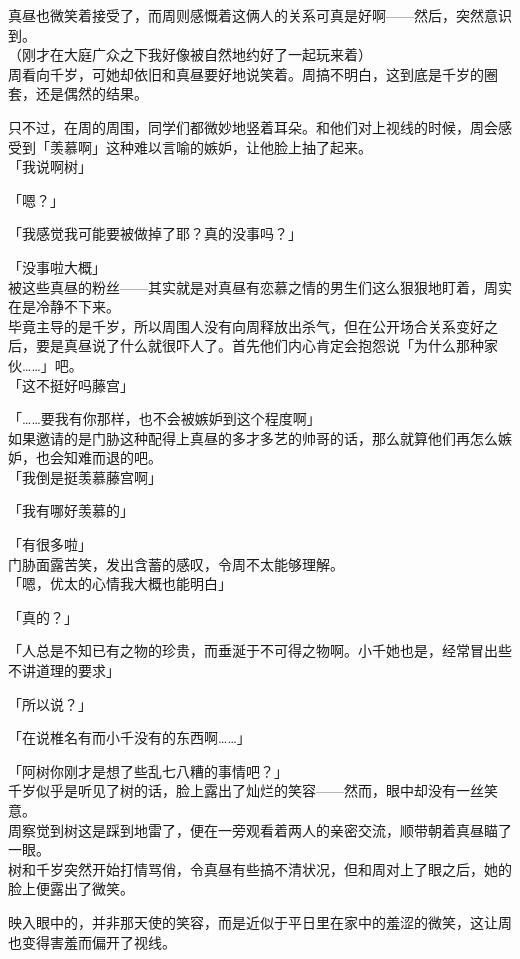 真昼也微笑着接受了，而周则感慨着这俩人的关系可真是好啊——然后，突然意识到。\\

（刚才在大庭广众之下我好像被自然地约好了一起玩来着）\\

周看向千岁，可她却依旧和真昼要好地说笑着。周搞不明白，这到底是千岁的圈套，还是偶然的结果。

只不过，在周的周围，同学们都微妙地竖着耳朵。和他们对上视线的时候，周会感受到「羡慕啊」这种难以言喻的嫉妒，让他脸上抽了起来。\\

「我说啊树」

「嗯？」

「我感觉我可能要被做掉了耶？真的没事吗？」

「没事啦大概」\\

被这些真昼的粉丝——其实就是对真昼有恋慕之情的男生们这么狠狠地盯着，周实在是冷静不下来。\\

毕竟主导的是千岁，所以周围人没有向周释放出杀气，但在公开场合关系变好之后，要是真昼说了什么就很吓人了。首先他们内心肯定会抱怨说「为什么那种家伙……」吧。\\

「这不挺好吗藤宫」

「……要我有你那样，也不会被嫉妒到这个程度啊」\\

如果邀请的是门胁这种配得上真昼的多才多艺的帅哥的话，那么就算他们再怎么嫉妒，也会知难而退的吧。\\

「我倒是挺羡慕藤宫啊」

「我有哪好羡慕的」

「有很多啦」\\

门胁面露苦笑，发出含蓄的感叹，令周不太能够理解。\\

「嗯，优太的心情我大概也能明白」

「真的？」

「人总是不知已有之物的珍贵，而垂涎于不可得之物啊。小千她也是，经常冒出些不讲道理的要求」

「所以说？」

「在说椎名有而小千没有的东西啊……」

「阿树你刚才是想了些乱七八糟的事情吧？」\\

千岁似乎是听见了树的话，脸上露出了灿烂的笑容——然而，眼中却没有一丝笑意。\\

周察觉到树这是踩到地雷了，便在一旁观看着两人的亲密交流，顺带朝着真昼瞄了一眼。\\

树和千岁突然开始打情骂俏，令真昼有些搞不清状况，但和周对上了眼之后，她的脸上便露出了微笑。

映入眼中的，并非那天使的笑容，而是近似于平日里在家中的羞涩的微笑，这让周也变得害羞而偏开了视线。
